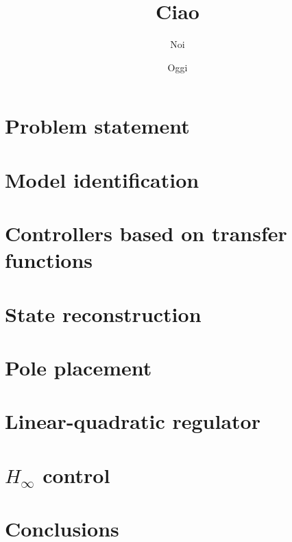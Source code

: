 \documentclass{report}
\title{Ciao}
\author{Noi}
\date{Oggi}
\begin{document}
	\maketitle
	\tableofcontents
	\chapter{Problem statement}
		
	\chapter{Model identification}
		
	\chapter{Controllers based on transfer functions}
		
	\chapter{State reconstruction}
		
	\chapter{Pole placement}
	  	
	\chapter{Linear-quadratic regulator}
		
	\chapter{\boldmath ${H_{\infty}}$ control}
		
	\chapter{Conclusions}
		
\end{document}
